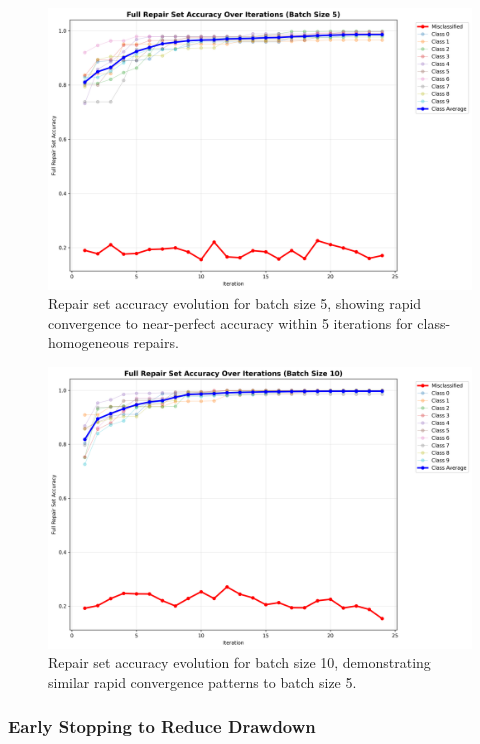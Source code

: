\documentclass{article}
\begin{document}
\begin{description}
\begin{figure}[h]
	\centering
	\includegraphics[width=\textwidth]{results/stochastic_analysis/batch_iterations/repair_accuracy_batch_5.png}
	\caption{Repair set accuracy evolution for batch size 5, showing rapid convergence to near-perfect accuracy within 5 iterations for class-homogeneous repairs.}
	\label{fig:repair_convergence_batch_5}
\end{figure}

\begin{figure}[h]
	\centering
	\includegraphics[width=\textwidth]{results/stochastic_analysis/batch_iterations/repair_accuracy_batch_10.png}
	\caption{Repair set accuracy evolution for batch size 10, demonstrating similar rapid convergence patterns to batch size 5.}
	\label{fig:repair_convergence_batch_10}
\end{figure}

\subsubsection{Early Stopping to Reduce Drawdown}


\end{description}
\end{document}
